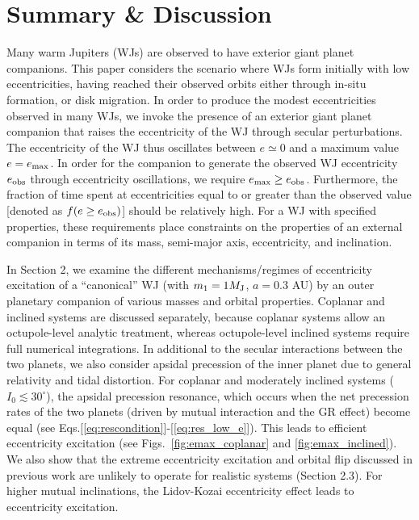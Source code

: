 \documentclass[12pt,useAMS, usenatbib]{mn2e}
\newcommand{\Max}{{\rm max}}
\newcommand{\emax}{e_\Max}
\newcommand{\eobs}{e_{\rm obs}}
\newcommand{\mjup}{M_{\rm J}}
\begin{document}
\section{Summary \& Discussion}
Many warm Jupiters (WJs) are observed to have exterior giant planet companions.  This paper considers the scenario where WJs form initially with low eccentricities, having reached their observed orbits either through in-situ formation, or disk migration.   In order to produce the modest eccentricities observed in many WJs, we invoke the presence of an exterior giant planet companion that raises the eccentricity of the WJ through secular perturbations.  The eccentricity of the WJ thus oscillates between $e \simeq 0$ and a maximum value $e = \emax$.  In order for the companion to generate the observed WJ eccentricity $\eobs$ through eccentricity oscillations, we require $\emax \geq \eobs$.  Furthermore, the fraction of time spent at eccentricities equal to or greater than the observed value [denoted as $f(e \geq \eobs)$] should be relatively high.  For a WJ with specified properties, these requirements place constraints on the properties of an external companion in terms of its mass, semi-major axis, eccentricity, and inclination. 

In Section 2, we examine the different mechanisms/regimes of eccentricity excitation of a ``canonical'' WJ (with $m_1 = 1 \mjup$, $a = 0.3$ AU) by an outer planetary companion of various masses and orbital properties.  Coplanar and inclined systems are discussed separately, because coplanar systems allow an octupole-level analytic treatment, whereas octupole-level inclined systems require full numerical integrations.  In additional to the secular interactions between the two planets, we also consider apsidal precession of the inner planet due to general relativity and tidal distortion.  For coplanar and moderately inclined systems ($I_0 \lesssim 30^\circ$), the apsidal precession resonance, which occurs when the net precession rates of the two planets (driven by mutual 
interaction and the GR effect) become equal (see Eqs.[\ref{eq:rescondition}]-[\ref{eq:res_low_e}]).  This leads to efficient eccentricity excitation (see Figs.~\ref{fig:emax_coplanar} and \ref{fig:emax_inclined}).  We also show that the extreme eccentricity 
excitation and orbital flip discussed in previous work \citep{li2014} are unlikely to operate for realistic systems (Section 2.3).  For higher mutual inclinations, the Lidov-Kozai eccentricity effect leads to eccentricity excitation.
\end{document}
